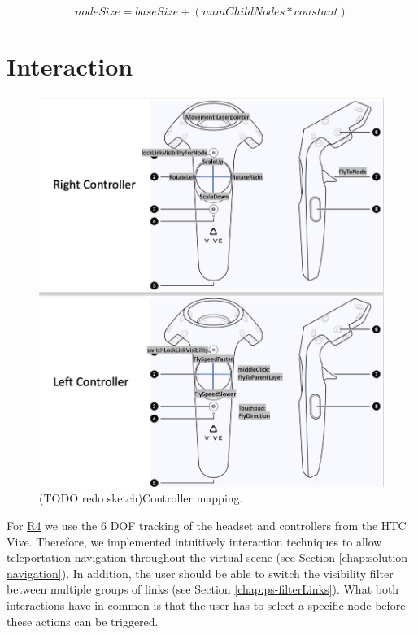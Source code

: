 \begin{equation}
    nodeSize = baseSize + (numChildNodes * constant)
\end{equation}

\section{Interaction}
\label{chap:solution-interaction}

\begin{figure}[h]
    \centering
    \includegraphics[width=1\textwidth]{chapters/graphics/controllerMapping.jpg}
    \caption{(TODO redo sketch)Controller mapping.} 
    \label{fig:controllerMapping} 
\end{figure}
For \hyperref[req:R4]{R4} we use the 6 DOF tracking of the headset and controllers from the HTC Vive. Therefore, we implemented intuitively interaction techniques to allow teleportation navigation throughout the virtual scene (see Section \ref{chap:solution-navigation}). In addition, the user should be able  to switch the visibility filter between multiple groups of links (see Section \ref{chap:ps-filterLinks}).
What both interactions have in common is that the user has to select a specific node before these actions can be triggered. 
